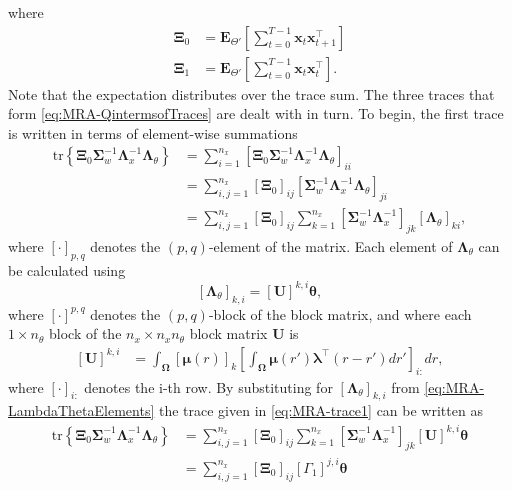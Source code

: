 \documentclass[11pt,draftcls,onecolumn,peerreview]{IEEEtran}
\begin{document}
where
\begin{align}
\boldsymbol\Xi_0&=\mathbf E_{\Theta'}\left[\sum_{t=0}^{T-1}\mathbf x_t\mathbf x_{t+1}^\top\right] \label{eq:MRA-Xi0}\\
\boldsymbol\Xi_1&=\mathbf E_{\Theta'}\left[\sum_{t=0}^{T-1}\mathbf x_t\mathbf x_{t}^\top\right] \label{eq:MRA-Xi1}.
\end{align}
Note that the expectation distributes over the trace sum. The three traces that form \eqref{eq:MRA-QintermsofTraces} are dealt with in turn. To begin, the first trace is written in terms of element-wise summations
\begin{align}\label{eq:MRA-trace1}
\mathrm{tr} \left\lbrace \boldsymbol \Xi_0\boldsymbol\Sigma_w^{-1}\boldsymbol\Lambda_x^{-1}\boldsymbol\Lambda_{\theta}\right\rbrace&=\sum_{i=1}^{n_x}\left[ \boldsymbol \Xi_0\boldsymbol\Sigma_w^{-1}\boldsymbol\Lambda_x^{-1}\boldsymbol\Lambda_{\theta}\right]_{ii} \nonumber \\
&=\sum_{i,j=1}^{n_x}\left[ \boldsymbol\Xi_0\right]_{ij}\left[\boldsymbol\Sigma_w^{-1}\boldsymbol\Lambda_x^{-1}  \boldsymbol\Lambda_{\theta}\right]_{ji}\nonumber\\
&=\sum_{i,j=1}^{n_x}\left[ \boldsymbol\Xi_0\right]_{ij}\sum_{k=1}^{n_x}\left[\boldsymbol\Sigma_w^{-1}\boldsymbol\Lambda_x^{-1} \right]_{jk} \left[ \boldsymbol\Lambda_{\theta}\right]_{ki},
\end{align}
where $[\cdot]_{p,q}$ denotes the $\left(p,q\right)$-element of the matrix. Each element of $\boldsymbol\Lambda_{\theta}$ can be calculated using
\begin{equation}\label{eq:MRA-LambdaThetaElements}
\left[ \boldsymbol\Lambda_{\theta}\right] _{k,i}=\left[ \mathbf U\right]^{k,i}\boldsymbol\theta,
\end{equation}
where $ [\cdot]^{p,q}$ denotes the $\left(p,q\right)$-block of the block matrix, and where
each $ 1 \times n_{\theta}$ block of the $n_x \times n_x n_{\theta}$ block matrix $\mathbf U$ is 
\begin{align}
\left[ \mathbf U\right] ^{k,i}&=\int_{\boldsymbol \Omega}\left[\boldsymbol\mu(r) \right]_k \left[\int_{\boldsymbol\Omega} \boldsymbol\mu\left(r'\right)\boldsymbol \lambda^\top \left(r-r'\right) dr'\right]_{i:} dr,
\end{align}
where $[\cdot]_{i:} $ denotes the i-th row.  By substituting for $\left[ \boldsymbol\Lambda_{\theta}\right] _{k,i}$ from \eqref{eq:MRA-LambdaThetaElements} the trace given in \eqref{eq:MRA-trace1} can be written as
\begin{align}
\mathrm{tr} \left\lbrace \boldsymbol \Xi_0\boldsymbol\Sigma_w^{-1}\boldsymbol\Lambda_x^{-1}\boldsymbol\Lambda_{\theta}\right\rbrace&=\sum_{i,j=1}^{n_x}\left[ \boldsymbol\Xi_0\right]_{ij}\sum_{k=1}^{n_x}\left[ \boldsymbol\Sigma_w^{-1}\boldsymbol\Lambda_x^{-1}\right]_{jk} \left[ \mathbf U\right]^{k,i}\boldsymbol\theta \nonumber \\
&=\sum_{i,j=1}^{n_x}\left[ \boldsymbol\Xi_0\right]_{ij}\left[ \Gamma_1\right] ^{j,i}\boldsymbol\theta
\end{align}
\end{document}
